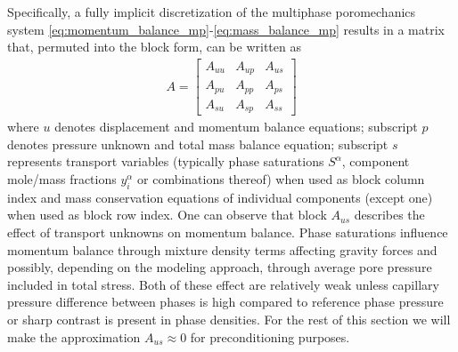 Specifically, a fully implicit discretization of the multiphase poromechanics system \eqref{eq:momentum_balance_mp}-\eqref{eq:mass_balance_mp} results in a matrix that, permuted into the block form, can be written as
\begin{align}
    A = 
    \begin{bmatrix}
        A_{uu} & A_{up} & A_{us} \\
        A_{pu} & A_{pp} & A_{ps} \\
        A_{su} & A_{sp} & A_{ss}
    \end{bmatrix}
    \label{eq:multiphase_poromechanics_block_form}
\end{align}
where $u$ denotes displacement and momentum balance equations; subscript $p$ denotes pressure unknown and total mass balance equation; subscript $s$ represents transport variables (typically phase saturations $S^\alpha$, component mole/mass fractions $y_i^\alpha$ or combinations thereof) when used as block column index and mass conservation equations of individual components (except one) when used as block row index.   One can observe that block $A_{us}$ describes the effect of transport unknowns on momentum balance.   Phase saturations influence momentum balance through mixture density terms affecting gravity forces and possibly, depending on the modeling approach, through average pore pressure included in total stress.   Both of these effect are relatively weak unless capillary pressure difference between phases is high compared to reference phase pressure or sharp contrast is present in phase densities.   For the rest of this section we will make the approximation $A_{us} \approx 0$ for preconditioning purposes.

